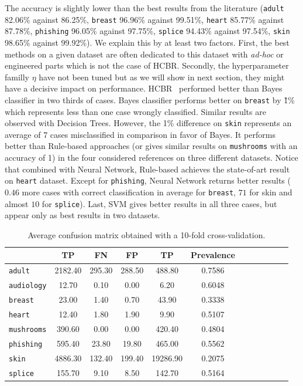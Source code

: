 \documentclass[sigconf,edbt]{acmart-edbt-workshops}
\def\HCBR{{\sc HCBR}}
\begin{document}
The accuracy is slightly lower than the best results from the literature (\texttt{adult} 82.06\% against 86.25\%, \texttt{breast} 96.96\% against 99.51\%, \texttt{heart} 85.77\% against 87.78\%, \texttt{phishing} 96.05\% against 97.75\%, \texttt{splice} 94.43\% against 97.54\%, \texttt{skin} 98.65\% against 99.92\%). We explain this by at least two factors. First, the best methods on a given dataset are often dedicated to this dataset with {\it ad-hoc} or engineered parts which is not the case of \HCBR. Secondly, the hyperparameter familly $\eta$ have not been tuned but as we will show in next section, they might have a decisive impact on performance.
\HCBR~ performed better than Bayes classifier in two thirds of cases. Bayes classifier performs better on \texttt{breast} by \~1\% which represents less than one case wrongly classified. Similar results are observed with Decision Trees. However, the 1\% difference on \texttt{skin} represents an average of 7 cases misclassified in comparison in favor of Bayes. It performs better than Rule-based approaches (or gives similar results on \texttt{mushrooms} with an accuracy of 1) in the four considered references on three different datasets. Notice that combined with Neural Network, Rule-based achieves the state-of-art result on \texttt{heart} dataset. Except for \texttt{phishing}, Neural Network returns better results ($0.46$ more cases with correct classification in average for \texttt{breast}, $71$ for skin and almost $10$ for \texttt{splice}). Last, SVM gives better results in all three cases, but appear only as best results in two datasets.
\begin{table}[htbp]
\begin{center}
  \caption{Average confusion matrix obtained with a 10-fold cross-validation.}
  \begin{small}
  \begin{tabular}{|l|c|c|c|c|c|c|c|c|c|c|c|}
    \hline
     & TP & FN & FP & TP & Prevalence\\
    \hline
    \texttt{adult} & 2182.40 & 295.30 & 288.50 & 488.80 & 0.7586\\
    \texttt{audiology} & 12.70 & 0.10 & 0.00 & 6.20 & 0.6048\\
    \texttt{breast} & 23.00 & 1.40 & 0.70 & 43.90 & 0.3338\\
    \texttt{heart} & 12.40 & 1.80 & 1.90 & 9.90 & 0.5107\\
    \texttt{mushrooms} & 390.60 & 0.00 & 0.00 & 420.40 & 0.4804\\
    \texttt{phishing} & 595.40 & 23.80 & 19.80 & 465.00 & 0.5562\\
    \texttt{skin} & 4886.30 & 132.40 & 199.40 & 19286.90 & 0.2075\\
    \texttt{splice} & 155.70 & 9.10 & 8.50 & 142.70 & 0.5164\\
    \hline
  \end{tabular}
  \end{small}
  \label{table:confusion_matrix}
\end{center}
\end{table}
\end{document}
